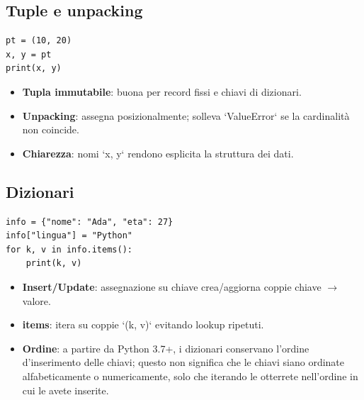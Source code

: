 \subsection{Tuple e unpacking}
\begin{lstlisting}
pt = (10, 20)
x, y = pt
print(x, y)
\end{lstlisting}
\begin{tcolorbox}[title=Spiegazione del codice]
\begin{itemize}
  \item \textbf{Tupla immutabile}: buona per record fissi e chiavi di dizionari.
  \item \textbf{Unpacking}: assegna posizionalmente; solleva `ValueError` se la cardinalità non coincide.
  \item \textbf{Chiarezza}: nomi `x, y` rendono esplicita la struttura dei dati.
\end{itemize}
\end{tcolorbox}

\subsection{Dizionari}
\begin{lstlisting}
info = {"nome": "Ada", "eta": 27}
info["lingua"] = "Python"
for k, v in info.items():
    print(k, v)
\end{lstlisting}
\begin{tcolorbox}[title=Spiegazione del codice]
\begin{itemize}
  \item \textbf{Insert/Update}: assegnazione su chiave crea/aggiorna coppie chiave $\rightarrow$ valore.
  \item \textbf{items}: itera su coppie `(k, v)` evitando lookup ripetuti.
  \item \textbf{Ordine}: a partire da Python 3.7+, i dizionari conservano l'ordine d'inserimento delle chiavi; questo non significa che le chiavi siano ordinate alfabeticamente o numericamente, solo che iterando le otterrete nell'ordine in cui le avete inserite.
\end{itemize}
\end{tcolorbox}

